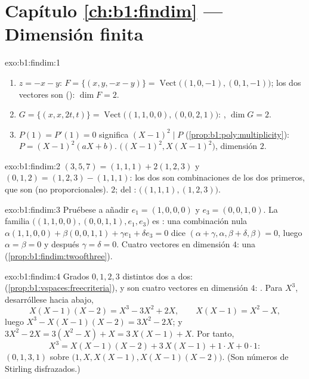 \section*{Capítulo \ref{ch:b1:findim} --- Dimensión finita}

\begin{solution}{exo:b1:findim:1}
\begin{enumerate}
  \item $z = -x - y$: $F = \{(x, y, -x-y)\} =
        \operatorname{Vect}\bigl((1,0,-1), (0,1,-1)\bigr)$; los dos
        vectores son  (): $\dim F = 2$.
  \item $G = \{(x, x, 2t, t)\} =
        \operatorname{Vect}\bigl((1,1,0,0), (0,0,2,1)\bigr)$:
        , $\dim G = 2$.
  \item $P(1) = P'(1) = 0$ significa $(X-1)^2 \mid P$
        (\cref{prop:b1:poly:multiplicity}): $P = (X-1)^2(aX + b)$.
         $\bigl((X-1)^2, X(X-1)^2\bigr)$, dimensión $2$.
\end{enumerate}
\end{solution}

\begin{solution}{exo:b1:findim:2}
$(3,5,7) = (1,1,1) + 2(1,2,3)$ y $(0,1,2) = (1,2,3) - (1,1,1)$: los
dos son combinaciones de los dos primeros, que son  (no
proporcionales).  $2$;  del :
$\bigl((1,1,1), (1,2,3)\bigr)$.
\end{solution}

\begin{solution}{exo:b1:findim:3}
Pruébese a añadir $e_1 = (1,0,0,0)$ y $e_3 = (0,0,1,0)$. La familia
$\bigl((1,1,0,0), (0,0,1,1), e_1, e_3\bigr)$ es : una
combinación nula $\alpha(1,1,0,0) + \beta(0,0,1,1) + \gamma e_1 +
\delta e_3 = 0$ dice $(\alpha + \gamma, \alpha, \beta + \delta,
\beta) = 0$, luego $\alpha = \beta = 0$ y después
$\gamma = \delta = 0$. Cuatro vectores  en dimensión $4$: una
 (\cref{prop:b1:findim:twoofthree}).
\end{solution}

\begin{solution}{exo:b1:findim:4}
Grados $0, 1, 2, 3$ distintos dos a dos: 
(\cref{prop:b1:vspaces:freecriteria}), y son cuatro vectores en
dimensión $4$: . Para $X^3$, desarróllese hacia abajo,
\[
X(X-1)(X-2) = X^3 - 3X^2 + 2X,
\qquad
X(X-1) = X^2 - X,
\]
luego $X^3 - X(X-1)(X-2) = 3X^2 - 2X$; y
$3X^2 - 2X = 3(X^2 - X) + X = 3\,X(X-1) + X$. Por tanto,
\[
X^3 = X(X-1)(X-2) + 3\,X(X-1) + 1\cdot X + 0\cdot 1 :
\]
 $(0, 1, 3, 1)$ sobre $\bigl(1, X, X(X-1),
X(X-1)(X-2)\bigr)$. (Son números de Stirling disfrazados.)
\end{solution}

